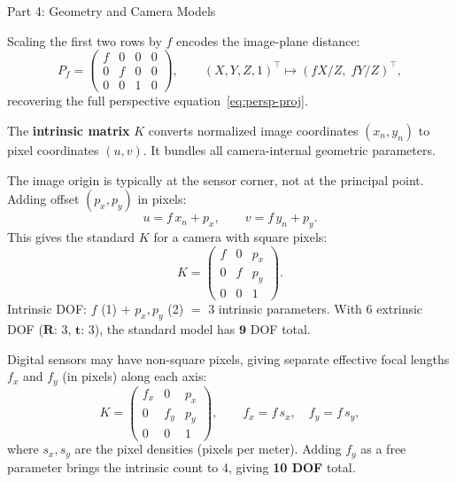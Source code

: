 \documentclass[letterpaper]{article}
\begin{document}
\begin{notes}{Part 4: Geometry and Camera Models}

Scaling the first two rows by $f$ encodes the image-plane distance:
\begin{equation}
  P_f = \begin{pmatrix}
    f & 0 & 0 & 0 \\
    0 & f & 0 & 0 \\
    0 & 0 & 1 & 0
  \end{pmatrix},
  \qquad
  (X,Y,Z,1)^\top \mapsto (fX/Z,\; fY/Z)^\top,
\end{equation}
recovering the full perspective equation~\eqref{eq:persp-proj}.


The \textbf{intrinsic matrix} $K$ converts normalized image coordinates
$(x_n, y_n)$ to pixel coordinates $(u, v)$.  It bundles all
camera-internal geometric parameters.


The image origin is typically at the sensor corner, not at the principal
point.  Adding offset $(p_x, p_y)$ in pixels:
\begin{equation}
  u = f\,x_n + p_x, \qquad v = f\,y_n + p_y.
\end{equation}
This gives the standard $K$ for a camera with square pixels:
\begin{equation}
  K = \begin{pmatrix}
    f   & 0 & p_x \\
    0   & f & p_y \\
    0   & 0 & 1
  \end{pmatrix}.
\end{equation}
Intrinsic DOF: $f$ (1) $+$ $p_x, p_y$ (2) $=$ 3 intrinsic parameters.
With 6 extrinsic DOF ($\mathbf{R}$: 3, $\mathbf{t}$: 3), the standard
model has $\mathbf{9}$ DOF total.


Digital sensors may have non-square pixels, giving separate effective focal
lengths $f_x$ and $f_y$ (in pixels) along each axis:
\begin{equation}
  K = \begin{pmatrix}
    f_x & 0   & p_x \\
    0   & f_y & p_y \\
    0   & 0   & 1
  \end{pmatrix}, \qquad f_x = f\,s_x,\quad f_y = f\,s_y,
\end{equation}
where $s_x, s_y$ are the pixel densities (pixels per meter).  Adding
$f_y$ as a free parameter brings the intrinsic count to 4, giving
\textbf{10 DOF} total.


\end{notes}
\end{document}
